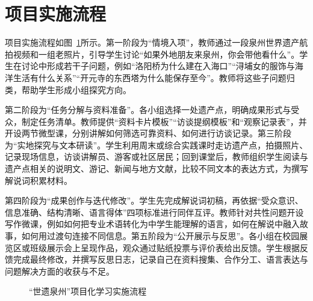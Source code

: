 \section{项目实施流程}

项目实施流程如图~\ref{fig:flow}所示。第一阶段为“情境入项”，教师通过一段泉州世界遗产航拍视频和一组老照片，引导学生讨论“如果外地朋友来泉州，你会带他看什么”。学生在讨论中形成若干子问题，例如“洛阳桥为什么建在入海口”“浔埔女的服饰与海洋生活有什么关系”“开元寺的东西塔为什么能保存至今”。教师将这些子问题归类，帮助学生形成小组探究方向。

第二阶段为“任务分解与资料准备”。各小组选择一处遗产点，明确成果形式与受众，制定任务清单。教师提供“资料卡片模板”“访谈提纲模板”和“观察记录表”，并开设两节微型课，分别讲解如何筛选可靠资料、如何进行访谈记录。第三阶段为“实地探究与文本研读”。学生利用周末或综合实践课时走访遗产点，拍摄照片、记录现场信息，访谈讲解员、游客或社区居民；回到课堂后，教师组织学生阅读与遗产点相关的说明文、游记、新闻与地方文献，比较不同文本的表达方式，为撰写解说词积累材料。

第四阶段为“成果创作与迭代修改”。学生先完成解说词初稿，再依据“受众意识、信息准确、结构清晰、语言得体”四项标准进行同伴互评。教师针对共性问题开设写作微课，例如如何把专业术语转化为中学生能理解的语言，如何在解说中融入故事，如何用过渡句连接不同信息。第五阶段为“公开展示与反思”。各小组在校园展览区或班级展示会上呈现作品，观众通过贴纸投票与评价表给出反馈。学生根据反馈完成最终修改，并撰写反思日志，记录自己在资料搜集、合作分工、语言表达与问题解决方面的收获与不足。

\begin{figure}[htbp]
  \centering
  \caption{“世遗泉州”项目化学习实施流程}
  \label{fig:flow}
\end{figure}

